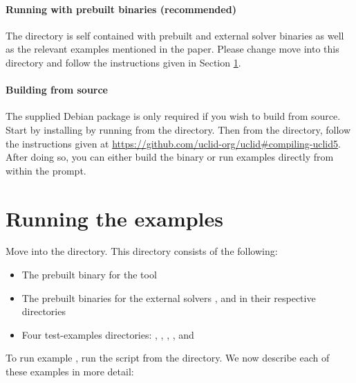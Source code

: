 \documentclass[runningheads]{llncs}
\begin{document}
\paragraph{Running with prebuilt binaries (recommended)}

The  directory is self contained with prebuilt \uclidcmd and external solver binaries as well as the relevant examples mentioned in the paper. Please change move into this directory and follow the instructions given in Section \ref{sec:running}.


\paragraph{Building from source} The supplied  Debian package is only required if you wish to build \uclidcmd from source. Start by installing  by running  from the  directory. Then from the  directory, follow the instructions given at \url{https://github.com/uclid-org/uclid#compiling-uclid5}. After doing so, you can either build the \uclidcmd binary or run examples directly from within the  prompt.


\section{Running the examples}
\label{sec:running}

Move into the  directory. This directory consists of the following:

\begin{itemize}
    \item The prebuilt binary for the tool 
    \item The prebuilt binaries for the external solvers ,  and  in their respective directories
    \item Four test-examples directories: , ,
    ,
    , and
\end{itemize}


To run example , run the script  from the  directory.
We now describe each of these examples in more detail:
\end{document}
